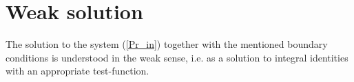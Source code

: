 \documentclass{amsart}
\begin{document}
\section{Weak solution}


The solution to the system  (\ref{Pr_in}) together with the mentioned boundary conditions is understood in the weak sense, i.e. as a solution to integral identities with an appropriate test-function.


\end{document}
